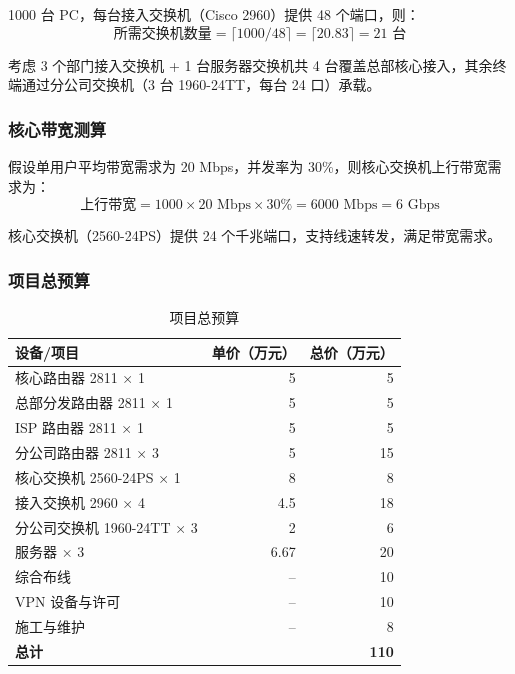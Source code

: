 \documentclass[12pt,a4paper]{ctexart}
\begin{document}
1000 台 PC，每台接入交换机（Cisco 2960）提供 48 个端口，则：
\[
\text{所需交换机数量} = \lceil 1000 / 48 \rceil = \lceil 20.83 \rceil = 21 \text{ 台}
\]

考虑 3 个部门接入交换机 + 1 台服务器交换机共 4 台覆盖总部核心接入，其余终端通过分公司交换机（3 台 1960-24TT，每台 24 口）承载。

\subsubsection{核心带宽测算}

假设单用户平均带宽需求为 20 Mbps，并发率为 30\%，则核心交换机上行带宽需求为：
\[
\text{上行带宽} = 1000 \times 20\text{ Mbps} \times 30\% = 6000\text{ Mbps} = 6\text{ Gbps}
\]

核心交换机（2560-24PS）提供 24 个千兆端口，支持线速转发，满足带宽需求。

\subsubsection{项目总预算}

\begin{table}[H]
\centering
\caption{项目总预算}
\begin{tabular}{|l|r|r|}
\hline
\textbf{设备/项目}       & \textbf{单价（万元）} & \textbf{总价（万元）} \\ \hline
核心路由器 2811 × 1      & 5                     & 5                     \\ \hline
总部分发路由器 2811 × 1  & 5                     & 5                     \\ \hline
ISP 路由器 2811 × 1      & 5                     & 5                     \\ \hline
分公司路由器 2811 × 3    & 5                     & 15                    \\ \hline
核心交换机 2560-24PS × 1 & 8                     & 8                     \\ \hline
接入交换机 2960 × 4      & 4.5                   & 18                    \\ \hline
分公司交换机 1960-24TT × 3 & 2                   & 6                     \\ \hline
服务器 × 3               & 6.67                  & 20                    \\ \hline
综合布线                  & --                    & 10                    \\ \hline
VPN 设备与许可            & --                    & 10                    \\ \hline
施工与维护                & --                    & 8                     \\ \hline
\textbf{总计}            &                       & \textbf{110}          \\ \hline
\end{tabular}
\end{table}
\end{document}
